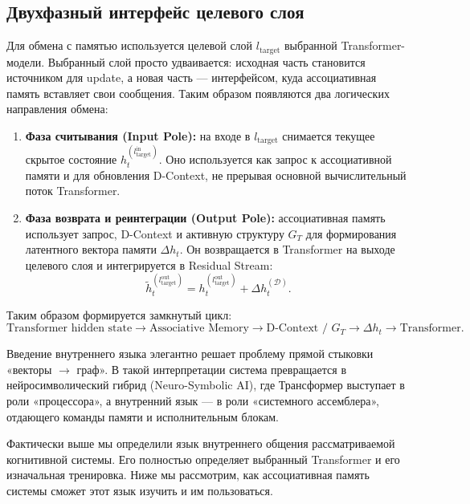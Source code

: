 \documentclass[11pt,a4paper]{article}
\begin{document}
\subsection*{Двухфазный интерфейс целевого слоя}

Для обмена с памятью используется целевой слой $l_{\text{target}}$ выбранной Transformer-модели. Выбранный слой просто удваивается: исходная часть становится источником для update, а новая часть — интерфейсом, куда ассоциативная память вставляет свои сообщения. Таким образом появляются два логических направления обмена:

\begin{enumerate}
    \item \textbf{Фаза считывания (Input Pole):} на входе в $l_{\text{target}}$ снимается текущее скрытое состояние $h_t^{(l_{\text{target}}^{\text{in}})}$. Оно используется как запрос к ассоциативной памяти и для обновления D-Context, не прерывая основной вычислительный поток Transformer.
    \item \textbf{Фаза возврата и реинтеграции (Output Pole):} ассоциативная память использует запрос, D-Context и активную структуру $G_T$ для формирования латентного вектора памяти $\Delta h_t$. Он возвращается в Transformer на выходе целевого слоя и интегрируется в Residual Stream:
    \begin{equation}
    \tilde{h}_t^{(l_{\text{target}}^{\text{out}})}
    =
    h_t^{(l_{\text{target}}^{\text{out}})}
    +
    \Delta h_t^{(\mathcal{D})}.
    \end{equation}
\end{enumerate}

Таким образом формируется замкнутый цикл:
\[
\text{Transformer hidden state}
\rightarrow
\text{Associative Memory}
\rightarrow
\text{D-Context / } G_T
\rightarrow
\Delta h_t
\rightarrow
\text{Transformer}.
\]

Введение внутреннего языка элегантно решает проблему прямой стыковки «векторы $\rightarrow$ граф». В такой интерпретации система превращается в нейросимволический гибрид (Neuro-Symbolic AI), где Трансформер выступает в роли «процессора», а внутренний язык — в роли «системного ассемблера», отдающего команды памяти и исполнительным блокам.

Фактически выше мы определили язык внутреннего общения рассматриваемой когнитивной системы. Его полностью определяет выбранный Transformer и его изначальная тренировка. Ниже мы рассмотрим, как ассоциативная память системы сможет этот язык изучить и им пользоваться.
\end{document}
